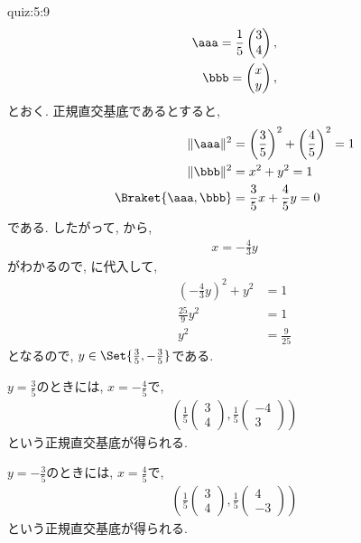 \begin{answerof}{quiz:5:9}
  \begin{align*}
    \aaa=\frac{1}{5}\begin{pmatrix}3\\4\end{pmatrix},\\
    \bbb=\begin{pmatrix}x\\y\end{pmatrix},
  \end{align*}
  とおく.
  正規直交基底であるとすると,
  \begin{align}
    \|\aaa\|^2&=\left(\frac{3}{5}\right)^2+\left(\frac{4}{5}\right)^2=1\\
    \|\bbb\|^2&=x^2+y^2=1     \label{orthonorm:eq1}\\
    \Braket{\aaa,\bbb}&=\frac{3}{5}x+\frac{4}{5}y=0
    \label{orthonorm:eq2}
  \end{align}
  である. したがって, から,
  \begin{align*}
    x=-\frac{4}{3}y
  \end{align*}
  がわかるので, に代入して,
  \begin{align*}
    \left(-\frac{4}{3}y\right)^2+y^2&=1\\
    \frac{25}{9}y^2&=1\\
    y^2&=\frac{9}{25}
  \end{align*}
  となるので, $y\in\Set{\frac{3}{5},-\frac{3}{5}}$である.

  $y=\frac{3}{5}$のときには,
  $x=-\frac{4}{5}$で,
  \begin{align*}
    (\frac{1}{5}\begin{pmatrix}3\\4\end{pmatrix},
    \frac{1}{5}\begin{pmatrix}-4\\3\end{pmatrix})
  \end{align*}
  という正規直交基底が得られる.

  $y=-\frac{3}{5}$のときには,
  $x=\frac{4}{5}$で,
  \begin{align*}
    (\frac{1}{5}\begin{pmatrix}3\\4\end{pmatrix},
    \frac{1}{5}\begin{pmatrix}4\\-3\end{pmatrix})
  \end{align*}
  という正規直交基底が得られる.
\end{answerof}

